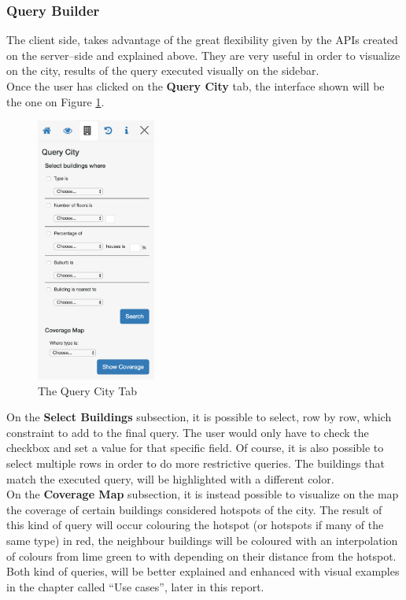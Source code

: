 \subsubsection{Query Builder}
The client side, takes advantage of the great flexibility given by the APIs created on the server--side and explained above. They are very useful in order to visualize on the city, results of the query executed visually on the sidebar.\\
Once the user has clicked on the {\bf Query City} tab, the interface shown will be the one on Figure \ref{fig:query_city_tab}.\\ 
\begin{figure}[H]
\centering
\includegraphics[width=0.35\textwidth]{chapter3/images/query_city_tab}
\caption{The Query City Tab}
\label{fig:query_city_tab}
\end{figure}
On the {\bf Select Buildings} subsection, it is possible to select, row by row, which constraint to add to the final query. The user would only have to check the checkbox and set a value for that specific field. Of course, it is also possible to select multiple rows in order to do more restrictive queries. The buildings that match the executed query, will be highlighted with a different color.\\

On the {\bf Coverage Map} subsection, it is instead possible to visualize on the map the coverage of certain buildings considered hotspots of the city. The result of this kind of query will occur colouring the hotspot (or hotspots if many of the same type) in red, the neighbour buildings will be coloured with an interpolation of colours from lime green to with depending on their distance from the hotspot.\\

Both kind of queries, will be better explained and enhanced with visual examples in the chapter called ``Use cases'', later in this report. 
